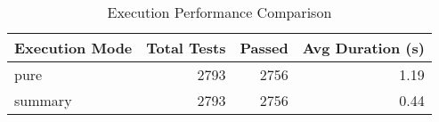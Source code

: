 \begin{table}[htbp]
\centering
\caption{Execution Performance Comparison}
\label{tab:concrete_performance_comparison}
\begin{tabular}{lrrr}
\toprule
Execution Mode & Total Tests & Passed & Avg Duration (s) \\
\midrule
pure & 2793 & 2756 & 1.19 \\
summary & 2793 & 2756 & 0.44 \\
\bottomrule
\end{tabular}
\end{table}